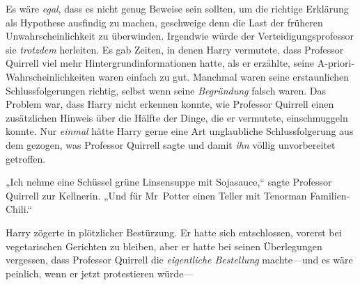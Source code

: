 Es wäre \emph{egal}, dass es nicht genug Beweise sein sollten, um die richtige Erklärung als Hypothese ausfindig zu machen, geschweige denn die Last der früheren Unwahrscheinlichkeit zu überwinden. Irgendwie würde der Verteidigungsprofessor sie \emph{trotzdem} herleiten. Es gab Zeiten, in denen Harry vermutete, dass Professor Quirrell viel mehr Hintergrundinformationen hatte, als er erzählte, seine A-priori-Wahrscheinlichkeiten waren einfach zu gut. Manchmal waren seine erstaunlichen Schlussfolgerungen richtig, selbst wenn seine \emph{Begründung} falsch waren. Das Problem war, dass Harry nicht erkennen konnte, wie Professor Quirrell einen zusätzlichen Hinweis über die Hälfte der Dinge, die er vermutete, einschmuggeln konnte. Nur \emph{einmal} hätte Harry gerne eine Art unglaubliche Schlussfolgerung aus dem gezogen, was Professor Quirrell sagte und damit \emph{ihn} völlig unvorbereitet getroffen.

\later

„Ich nehme eine Schüssel grüne Linsensuppe mit Sojasauce,“ sagte Professor Quirrell zur Kellnerin. „Und für Mr~Potter einen Teller mit Tenorman Familien-Chili.“

Harry zögerte in plötzlicher Bestürzung. Er hatte sich entschlossen, vorerst bei vegetarischen Gerichten zu bleiben, aber er hatte bei seinen Überlegungen vergessen, dass Professor Quirrell die \emph{eigentliche Bestellung} machte—und es wäre peinlich, wenn er jetzt protestieren würde—

